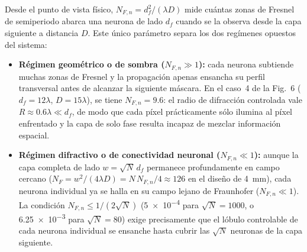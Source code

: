 Desde el punto de vista físico, $N_{F,n}=d_f^2/(\lambda D)$ mide cuántas zonas de Fresnel de
semiperiodo abarca una neurona de lado $d_f$ cuando se la observa desde la capa siguiente a
distancia $D$. Este único parámetro separa los dos regímenes opuestos del sistema:
\begin{itemize}
  \item \textbf{Régimen geométrico o de sombra ($N_{F,n}\gg 1$):} cada neurona subtiende muchas
  zonas de Fresnel y la propagación apenas ensancha su perfil transversal antes de alcanzar la
  siguiente máscara. En el caso~4 de la Fig.~6 ($d_f=12\lambda$, $D=15\lambda$), se tiene
  $N_{F,n}=9.6$: el radio de difracción controlada vale $R\approx 0.6\lambda\ll d_f$, de modo
  que cada píxel prácticamente sólo ilumina al píxel enfrentado y la capa de solo fase resulta
  incapaz de mezclar información espacial.
  \item \textbf{Régimen difractivo o de conectividad neuronal ($N_{F,n}\ll 1$):} aunque la capa
  completa de lado $w=\sqrt N\,d_f$ permanece profundamente en campo cercano ($N_F =
  w^2/(4\lambda D) = N\,N_{F,n}/4\approx 126$ en el diseño de \SI{4}{mm}), cada neurona
  individual ya se halla en su campo lejano de Fraunhofer ($N_{F,n}\ll 1$). La condición
  $N_{F,n}\le 1/(2\sqrt N)$ (\num{5e-4} para $\sqrt N=1000$, o \num{6.25e-3} para
  $\sqrt N=80$) exige precisamente que el lóbulo controlable de cada neurona individual se
  ensanche hasta cubrir las $\sqrt N$ neuronas de la capa siguiente.
\end{itemize}
